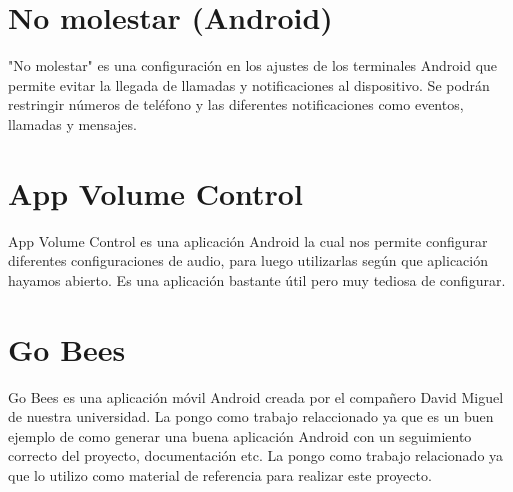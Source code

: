 
\section{No molestar (Android)}
"No molestar" es una configuración en los ajustes de los terminales Android que permite evitar la llegada de llamadas y notificaciones al dispositivo. Se podrán restringir números de teléfono y las diferentes notificaciones como eventos, llamadas y mensajes.

\section{App Volume Control}
App Volume Control es una aplicación Android la cual nos permite configurar diferentes configuraciones de audio, para luego utilizarlas según que aplicación hayamos abierto. Es una aplicación bastante útil pero muy tediosa de configurar.

\section{Go Bees}
Go Bees es una aplicación móvil Android creada por el compañero David Miguel de nuestra universidad.
La pongo como trabajo relaccionado ya que es un buen ejemplo de como generar una buena aplicación Android con un seguimiento correcto del proyecto, documentación etc. La pongo como trabajo relacionado ya que lo utilizo como material de referencia para realizar este proyecto.

